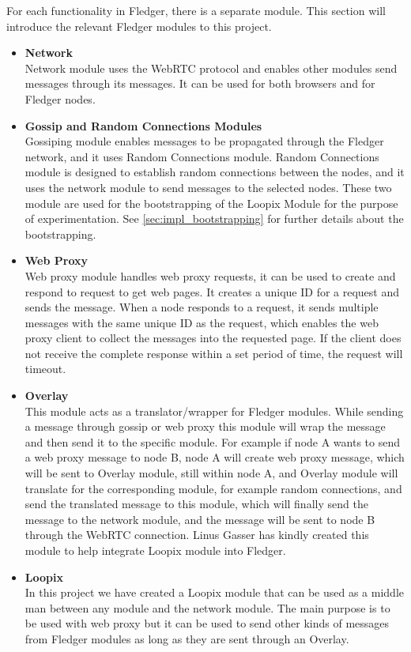 \documentclass[a4paper,11pt,oneside]{report}
\begin{document}
For each functionality in Fledger, there is a separate module. This section will introduce the relevant Fledger modules to this project.

\begin{itemize}
    \item \textbf{Network}\\
    Network module uses the WebRTC protocol and enables other modules send messages through its messages. It can be used for both browsers and for Fledger nodes.
    \item \textbf{Gossip and Random Connections Modules} \\
    Gossiping module enables messages to be propagated through the Fledger network, and it uses Random Connections module. Random Connections module is designed to establish random connections between the nodes, and it uses the network module to send messages to the selected nodes. These two module are used for the bootstrapping of the Loopix Module for the purpose of experimentation. See \autoref{sec:impl_bootstrapping} for further details about the bootstrapping.
    \item \textbf{Web Proxy}\\
    Web proxy module handles web proxy requests, it can be used to create and respond to request to get web pages. It creates a unique ID for a request and sends the message. When a node responds to a request, it sends multiple messages with the same unique ID as the request, which enables the web proxy client to collect the messages into the requested page. If the client does not receive the complete response within a set period of time, the request will timeout.
    \item \textbf{Overlay}\\
    This module acts as a translator/wrapper for Fledger modules. While sending a message through gossip or web proxy this module will wrap the message and then send it to the specific module. For example if node A wants to send a web proxy message to node B, node A will create web proxy message, which will be sent to Overlay module, still within node A, and Overlay module will translate for the corresponding module, for example random connections, and send the translated message to this module, which will finally send the message to the network module, and the message will be sent to node B through the WebRTC connection. Linus Gasser has kindly created this module to help integrate Loopix module into Fledger.
    \item \textbf{Loopix}\\
    In this project we have created a Loopix module that can be used as a middle man between any module and the network module. The main purpose is to be used with web proxy but it can be used to send other kinds of messages from Fledger modules as long as they are sent through an Overlay.
\end{itemize}
\end{document}
